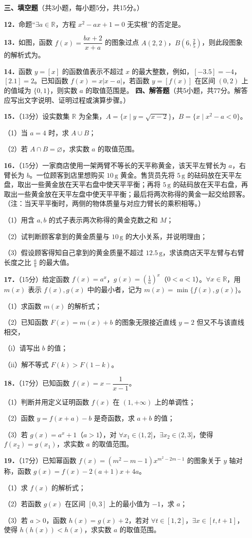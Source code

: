 \documentclass[UTF8,a4paper,12pt]{ctexart}
\newcommand{\subq}[1]{\par（#1）}
\newcommand{\q}[1]{\par\textbf{#1．}}
\newcommand{\blank}{\underline{\hspace{3cm}}}
\begin{document}
\textbf{三、填空题}（共3小题，每小题5分，共15分。）
\q{12}命题“$\exists a\in\mathbb R$，方程 $x^2-ax+1=0$ 无实根”的否定是\blank。
\q{13}如图，函数 $f(x)=\dfrac{bx+2}{x+a}$ 的图象过点 $A(2,2)$，$B\left(6,\frac25\right)$，则此段图象的解析式为\underline{\hspace{2cm}}。
\par{}
\q{14}函数 $y=[x]$ 的函数值表示不超过 $x$ 的最大整数，例如，$[-3.5]=-4$，$[2.1]=2$。已知函数 $f(x)=x|x-a|$，若函数 $y=[f(x)]$ 在区间 $(0,2)$ 上的值域为 $\{0,1\}$，则实数 $a$ 的取值范围是\blank。
\newpage
\textbf{四、解答题}（共5小题，共77分。解答应写出文字说明、证明过程或演算步骤。）
\q{15}（13分）设实数集 $\mathbb R$ 为全集，$A=\{x\mid y=\sqrt{x-2}\}$，$B=\{x\mid x^2-a<0\}$。
\subq{1}当 $a=4$ 时，求 $A\cup B$；
\subq{2}若 $A\cap B=\varnothing$，求实数 $a$ 的取值范围。
\par\vspace*{2.4cm}
\q{16}（15分）一家商店使用一架两臂不等长的天平称黄金，该天平左臂长为 $a$，右臂长为 $b$。一位顾客到店里想购买 $10\,\mathrm g$ 黄金。售货员先将 $5\,\mathrm g$ 的砝码放在天平左盘，取出一些黄金放在天平右盘中使天平平衡；再将 $5\,\mathrm g$ 的砝码放在天平右盘，再取出一些黄金放在天平左盘中使天平平衡；最后将两次称得的黄金一起交给顾客。（注：当天平平衡时，两侧的物体质量与对应力臂长的乘积相等。）
\subq{1}用含 $a,b$ 的式子表示两次称得的黄金克数之和 $M$；
\subq{2}试判断顾客拿到的黄金质量与 $10\,\mathrm g$ 的大小关系，并说明理由；
\subq{3}假设顾客得知自己拿到的黄金质量不超过 $12.5\,\mathrm g$，求该商店天平左臂与右臂长度之比 $\frac ab$ 的最大值。
\par\vspace*{2.4cm}
\q{17}（15分）给定函数 $f(x)=a^x$，$g(x)=\left(\frac1a\right)^x$（$0<a<1$）。$\forall x\in\mathbb R$，用 $m(x)$ 表示 $f(x),g(x)$ 中的最小者，记为 $m(x)=\min\{f(x),g(x)\}$。
\subq{1}求函数 $m(x)$ 的解析式；
\subq{2}已知函数 $F(x)=m(x)+b$ 的图象无限接近直线 $y=2$ 但又不与该直线相交，
\subq{i}请写出 $b$ 的值；
\subq{ii}解不等式 $F(k)>F(1-k)$。
\par\vspace*{2.4cm}
\newpage
\q{18}（17分）已知函数 $f(x)=x-\dfrac1{x-1}$。
\subq{1}判断并用定义证明函数 $f(x)$ 在 $(1,+\infty)$ 上的单调性；
\subq{2}函数 $y=f(x+a)-b$ 是奇函数，求 $a+b$ 的值；
\subq{3}若 $g(x)=a^x+1$（$a>1$），对 $\forall x_1\in(1,2]$，$\exists x_2\in(2,3]$，使得 $f(x_2)=g(x_1)$，求实数 $a$ 的取值范围。
\par\vspace*{6cm}
\q{19}（17分）已知幂函数 $f(x)=(m^2-m-1)x^{m^2-2m-1}$ 的图象关于 $y$ 轴对称，函数 $g(x)=f(x)-2(a+1)x+4a$。
\subq{1}求 $f(x)$ 的解析式；
\subq{2}若函数 $g(x)$ 在区间 $[0,3]$ 上的最小值为 $-1$，求 $a$；
\subq{3}若 $a>0$，函数 $h(x)=g(x)+2$，若对 $\forall t\in[1,2]$，$\exists x\in[t,t+1]$，使得 $h(h(x))<h(x)$，求实数 $a$ 的取值范围。
\par\vspace*{6cm}
\end{document}
